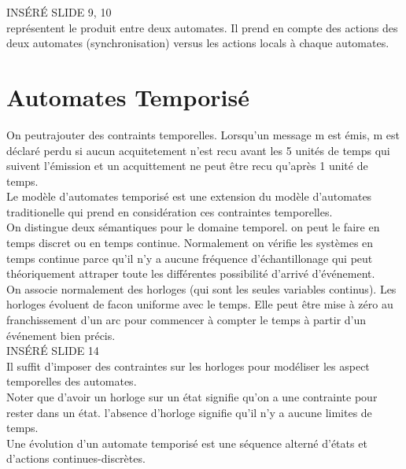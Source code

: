\documentclass[oneside]{book}
\begin{document}
    INSÉRÉ SLIDE 9, 10\\
    
    représentent le produit entre deux automates. Il prend en compte des actions des deux automates (synchronisation) versus les actions locals à chaque automates.\\
    
    
    
    
    \section{Automates Temporisé}
    On peutrajouter des contraints temporelles. Lorsqu'un message m est émis, m est déclaré perdu si aucun acquitetement n'est recu avant les 5 unités de temps qui suivent l'émission et un acquittement ne peut être recu qu'après 1 unité de temps.\\
    
    Le modèle d'automates temporisé est une extension du modèle d'automates traditionelle qui prend en considération ces contraintes temporelles.\\
    
    On distingue deux sémantiques pour le domaine temporel. on peut le faire en temps discret ou en temps continue. Normalement on vérifie les systèmes en temps continue parce qu'il n'y a aucune fréquence d'échantillonage qui peut théoriquement attraper toute les différentes possibilité d'arrivé d'événement.\\
    
    On associe normalement des horloges (qui sont les seules variables continus). Les horloges évoluent de facon uniforme avec le temps. Elle peut être mise à zéro au franchissement d'un arc pour commencer à compter le temps à partir d'un événement bien précis.\\
    
    INSÉRÉ SLIDE 14\\
    
    Il suffit d'imposer des contraintes sur les horloges pour modéliser les aspect temporelles des automates.\\
    
    Noter que d'avoir un horloge sur un état signifie qu'on a une contrainte pour rester dans un état. l'absence d'horloge signifie qu'il n'y a aucune limites de temps.\\
    
    Une évolution d'un automate temporisé est une séquence alterné d'états et d'actions continues-discrètes.\\
    
\end{document}

